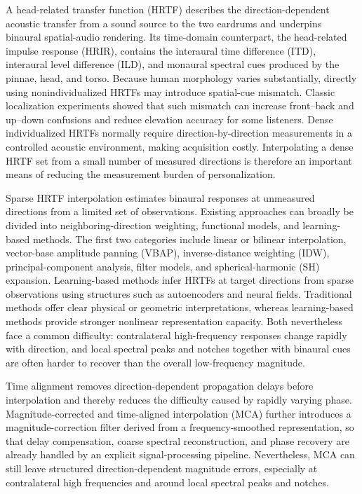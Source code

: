 \documentclass[UTF8,a4paper]{article}
\begin{document}
A head-related transfer function (HRTF) describes the direction-dependent acoustic transfer from a sound source to the two eardrums and underpins binaural spatial-audio rendering. Its time-domain counterpart, the head-related impulse response (HRIR), contains the interaural time difference (ITD), interaural level difference (ILD), and monaural spectral cues produced by the pinnae, head, and torso\cite{R6}. Because human morphology varies substantially, directly using nonindividualized HRTFs may introduce spatial-cue mismatch. Classic localization experiments showed that such mismatch can increase front--back and up--down confusions and reduce elevation accuracy for some listeners\cite{R27}. Dense individualized HRTFs normally require direction-by-direction measurements in a controlled acoustic environment, making acquisition costly. Interpolating a dense HRTF set from a small number of measured directions is therefore an important means of reducing the measurement burden of personalization\cite{R13}.

Sparse HRTF interpolation estimates binaural responses at unmeasured directions from a limited set of observations. Existing approaches can broadly be divided into neighboring-direction weighting, functional models, and learning-based methods\cite{R15}. The first two categories include linear or bilinear interpolation, vector-base amplitude panning (VBAP), inverse-distance weighting (IDW), principal-component analysis, filter models, and spherical-harmonic (SH) expansion\cite{R2,R3}. Learning-based methods infer HRTFs at target directions from sparse observations using structures such as autoencoders and neural fields\cite{R4,R5}. Traditional methods offer clear physical or geometric interpretations, whereas learning-based methods provide stronger nonlinear representation capacity. Both nevertheless face a common difficulty: contralateral high-frequency responses change rapidly with direction, and local spectral peaks and notches together with binaural cues are often harder to recover than the overall low-frequency magnitude.

Time alignment removes direction-dependent propagation delays before interpolation and thereby reduces the difficulty caused by rapidly varying phase\cite{R3}. Magnitude-corrected and time-aligned interpolation (MCA) further introduces a magnitude-correction filter derived from a frequency-smoothed representation, so that delay compensation, coarse spectral reconstruction, and phase recovery are already handled by an explicit signal-processing pipeline\cite{R1}. Nevertheless, MCA can still leave structured direction-dependent magnitude errors, especially at contralateral high frequencies and around local spectral peaks and notches.
\end{document}
